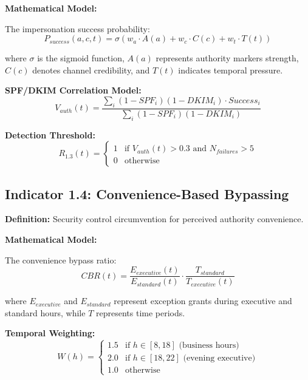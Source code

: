 \documentclass[11pt,a4paper]{article}
\begin{document}
\textbf{Mathematical Model:}

The impersonation success probability:
\begin{equation}
P_{success}(a,c,t) = \sigma(w_a \cdot A(a) + w_c \cdot C(c) + w_t \cdot T(t))
\end{equation}

where $\sigma$ is the sigmoid function, $A(a)$ represents authority markers strength, $C(c)$ denotes channel credibility, and $T(t)$ indicates temporal pressure.

\textbf{SPF/DKIM Correlation Model:}
\begin{equation}
V_{auth}(t) = \frac{\sum_{i} (1-SPF_i)(1-DKIM_i) \cdot Success_i}{\sum_{i} (1-SPF_i)(1-DKIM_i)}
\end{equation}

\textbf{Detection Threshold:}
\begin{equation}
R_{1.3}(t) = \begin{cases}
1 & \text{if } V_{auth}(t) > 0.3 \text{ and } N_{failures} > 5 \\
0 & \text{otherwise}
\end{cases}
\end{equation}

\subsection{Indicator 1.4: Convenience-Based Bypassing}

\textbf{Definition:} Security control circumvention for perceived authority convenience.

\textbf{Mathematical Model:}

The convenience bypass ratio:
\begin{equation}
CBR(t) = \frac{E_{executive}(t)}{E_{standard}(t)} \cdot \frac{T_{standard}}{T_{executive}(t)}
\end{equation}

where $E_{executive}$ and $E_{standard}$ represent exception grants during executive and standard hours, while $T$ represents time periods.

\textbf{Temporal Weighting:}
\begin{equation}
W(h) = \begin{cases}
1.5 & \text{if } h \in [8,18] \text{ (business hours)} \\
2.0 & \text{if } h \in [18,22] \text{ (evening executive)} \\
1.0 & \text{otherwise}
\end{cases}
\end{equation}
\end{document}
